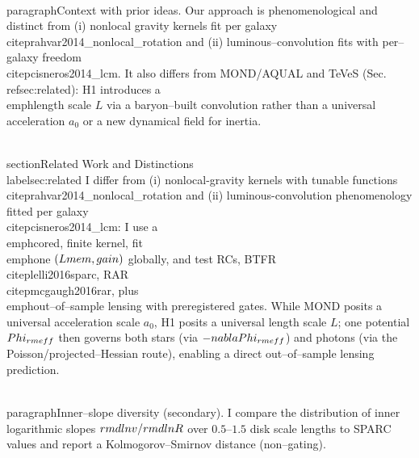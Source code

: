 \documentclass[11pt,a4paper]{article}
\newcommand{\Lmem}{L}       %
\newcommand{\gain}{\mu}     %
\begin{document}
\\paragraph{Context with prior ideas.}
Our approach is phenomenological and distinct from (i) nonlocal gravity kernels fit per galaxy \\citep{rahvar2014_nonlocal_rotation} and (ii) luminous–convolution fits with per–galaxy freedom \\citep{cisneros2014_lcm}. It also differs from MOND/AQUAL and TeVeS (Sec.~\\ref{sec:related}): H1 introduces a \\emph{length} scale $L$ via a baryon–built convolution rather than a universal acceleration $a_0$ or a new dynamical field for inertia.

\\section{Related Work and Distinctions}\\label{sec:related}
I differ from (i) nonlocal-gravity kernels with tunable functions \\citep{rahvar2014_nonlocal_rotation} and (ii) luminous-convolution phenomenology fitted per galaxy \\citep{cisneros2014_lcm}: I use a \\emph{cored, finite} kernel, fit \\emph{one} $(\\Lmem,\\gain)$ globally, and test RCs, BTFR \\citep{lelli2016sparc}, RAR \\citep{mcgaugh2016rar}, plus \\emph{out–of–sample} lensing with preregistered gates.
While MOND posits a universal acceleration scale $a_0$, H1 posits a universal length scale $L$; one potential $\\Phi_{\\rm eff}$ then governs both stars (via $-\\nabla\\Phi_{\\rm eff}$) and photons (via the Poisson/projected–Hessian route), enabling a direct out–of–sample lensing prediction.

\\paragraph{Inner–slope diversity (secondary).}
I compare the distribution of inner logarithmic slopes $\\rm d\\ln v/\\rm d\\ln R$ over $0.5$–$1.5$ disk scale lengths to SPARC values and report a Kolmogorov–Smirnov distance (non–gating).
\end{document}
